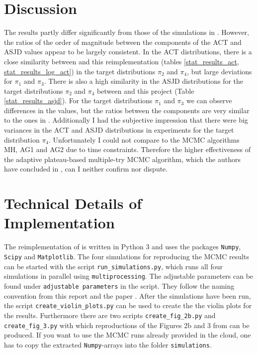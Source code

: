 \documentclass{scrartcl}
\begin{document}
    \section{Discussion}
    The results partly differ significantly from those of the simulations in \cite{lau2019}.
    However, the ratios of the order of magnitude between the components of the ACT and ASJD values appear to be largely consistent.
    In the ACT distributions, there is a close similarity between \cite{lau2019} and this reimplementation (tables \ref{stat_results_act, stat_results_log_act}) in the target distributions
    $\pi_2$ and $\pi_4$, but large deviations for $\pi_1$ and $\pi_3$. There is also a high similarity in the ASJD distributions for the target distributions $\pi_2$ and $\pi_4$
    between \cite{lau2019} and this project (Table \ref{stat_results_asjd}). For the target distributions $\pi_1$ and $\pi_3$ we can observe
    differences in the values, but the ratios between the components are very similar to the ones in \cite{lau2019}.
    Additionally I had the subjective impression that there were big variances in the ACT and ASJD distributions in experiments for the target distribution $\pi_4$.
    Unfortunately I could not compare to the MCMC algorithms MH, AG1 and AG2 \cite{lau2019} due to time constraints. Therefore
    the higher effectiveness of the adaptive plateau-based multiple-try MCMC algorithm, which the authors have concluded in \cite{lau2019},
    can I neither confirm nor dispute.


    \section{Technical Details of Implementation}
    The reimplementation of \cite{lau2019} is written in Python 3 and uses the packages \texttt{Numpy}, \texttt{Scipy}
    and \texttt{Matplotlib}. The four simulations for reproducing the MCMC results can be started with the script
    \texttt{run\_simulations.py}, which runs all four simulations in parallel using \texttt{multiprocessing}.
    The adjustable parameters can be found under \texttt{adjustable parameters} in the script. They follow the naming convention from this report
    and the paper \cite{lau2019}. After the simulations have been run, the script \texttt{create\_violin\_plots.py} can be used to create the
    the violin plots for the results. Furthermore there are two scripts \texttt{create\_fig\_2b.py}
    and \texttt{create\_fig\_3.py} with which reproductions of the Figures 2b and 3 from \cite{lau2019} can be produced.
    If you want to use the MCMC runs already provided in the cloud, one has to copy the extracted \texttt{Numpy}-arrays into the folder
    \texttt{simulations}.

    
    
\end{document}
